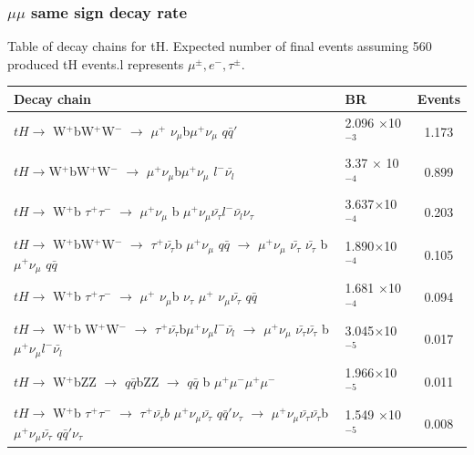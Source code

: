 \documentclass[11pt]{beamer}
\begin{document}
\begin{frame}
\frametitle{$\mu\mu$ same sign decay rate}
\tiny{Table of decay chains for tH.  Expected number of final events assuming 560 produced tH events.l represents $\mu^{\pm},e^- , \tau^\pm$. }
\begin{table}
\renewcommand{\arraystretch}{0.55}
\begin{tabular}{|p{8cm}|p{1.3cm}|c|}
\hline
Decay chain &BR&Events\\
\hline 
\tiny{$tH \rightarrow$ W$^+$bW$^+$W$^-$ $\rightarrow$ $\mu^+$ $\nu_\mu$b$\mu^+\nu_\mu$  $q \bar{q}'$ } &\tiny{2.096 $\times$10$^{-3}$} &  1.173  \\
\hline
\tiny{$tH \rightarrow $W$^+$bW$^+$W$^-$ $\rightarrow$ $\mu^+\nu_\mu$b$\mu^+\nu_\mu$ $l^- \bar{\nu_l}$ } &\tiny{3.37 $\times$ 10$^{-4}$} &0.899 \\
\hline
\tiny{$tH \rightarrow$ W$^+$b $\tau^+ \tau^-$ $\rightarrow$ $\mu^+ \nu_\mu$ b $ \mu^+ \nu_\mu \bar{\nu_\tau} l^-\bar{\nu_l} \nu_\tau$} &\tiny{3.637$\times$10$^{-4}$}&0.203 \\
\hline
\tiny{$tH \rightarrow$ W$^+$bW$^+$W$^-$ $\rightarrow$ $\tau^+ \bar{\nu_\tau}$b $\mu^+ \nu_\mu$  $q\bar{q}$ $\rightarrow$ $\mu^+ \nu_\mu$ $\bar{\nu_\tau}$ $\bar{\nu_\tau}$ b$\mu^+ \nu_\mu$  $q \bar{q}$} &\tiny{1.890$\times$10$^{-4}$}&0.105  \\
\hline
\tiny{$tH \rightarrow$ W$^+$b $\tau^+ \tau^-$ $\rightarrow$ $\mu^+$ $\nu_\mu$b $\nu_\tau$ $\mu^+$ $\nu_\mu \bar{\nu_\tau}$} $q \bar{q}$  &
\tiny{1.681 $\times$10$^{-4}$} & 0.094 \\
\hline
\tiny{$tH \rightarrow$ W$^+$b W$^+$W$^-$ $\rightarrow$ $\tau^+ \bar{\nu_\tau}$b$ \mu^+ \nu_\mu l^- \bar{\nu_l}$ $\rightarrow$ $\mu^+\nu_\mu$ $ \bar{\nu_\tau} \bar{\nu_\tau}$  b$ \mu^+ \nu_\mu l^- \bar{\nu_l}$} &\tiny{3.045$\times$10$^{-5}$}& 0.017\\
\hline
\tiny{$tH \rightarrow$ W$^+$bZZ $\rightarrow$ $q \bar{q}$bZZ $\rightarrow$ $q \bar{q} $ b $\mu^+ \mu^- \mu^+ \mu^-$} & \tiny{1.966$\times$10$^{-5}$} &0.011\\
\hline 
\tiny{$tH \rightarrow$ W$^+$b $\tau^+ \tau^-$ $\rightarrow$ $\tau^+ \bar{\nu_\tau}b$ $\mu^+ \nu_\mu \bar{\nu_\tau} $  $q\bar{q}' \nu_\tau$ $\rightarrow$  $\mu^+ \nu_\mu \bar{\nu_\tau}\bar{\nu_\tau} $b $\mu^+ \nu_\mu \bar{\nu_\tau} $  $q\bar{q}' \nu_\tau$ } &\tiny{1.549 $\times$10$^{-5}$} &  0.008  \\
\hline
\end{tabular}
\end{table}
\end{frame}
\end{document}
